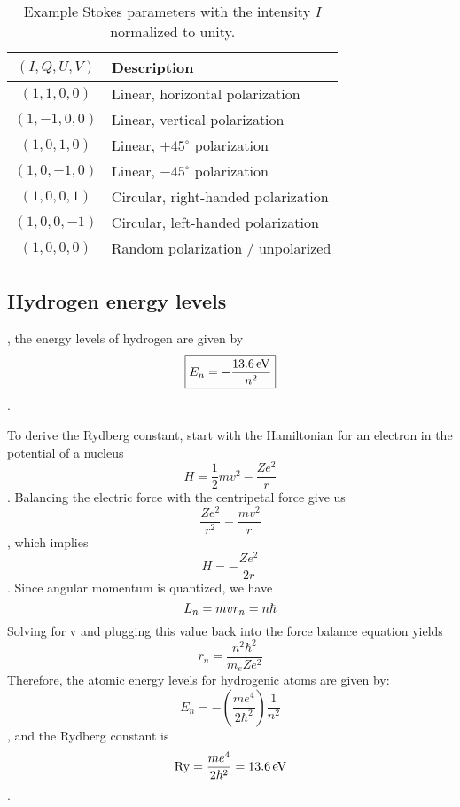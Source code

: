 \begin{table}[ht]
\centering
\begin{tabular}{cl}
\toprule
$(I,Q,U,V)$ & Description \\
\midrule
$(1,1,0,0)$ & Linear, horizontal polarization \\
$(1,-1,0,0)$ & Linear, vertical polarization \\
$(1,0,1,0)$ & Linear, $+45^\circ$ polarization \\
$(1,0,-1,0)$ & Linear, $-45^\circ$ polarization \\
$(1,0,0,1)$ & Circular, right-handed polarization \\
$(1,0,0,-1)$ & Circular, left-handed polarization \\
$(1,0,0,0)$ & Random polarization / unpolarized \\
\bottomrule
\end{tabular}
\caption{Example Stokes parameters with the intensity $I$ normalized to unity.}
\label{tab:stokes}
\end{table}

\subsection{Hydrogen energy levels}
, the energy levels of hydrogen are given by
\begin{dmath}\boxed{
E_n = -\frac{13.6\,{\rm eV}}{n^2}
}\end{dmath}.

To derive the Rydberg constant, start with the Hamiltonian for an electron in the
potential of a nucleus
\begin{dmath}
H = \frac{1}{2}mv^2 - \frac{Ze^2}{r}
\end{dmath}.
Balancing the electric force with the centripetal force give us
\begin{dmath*}
\frac{Ze^2}{r^2} = \frac{mv^2}{r}
\end{dmath*},
which implies
\begin{dmath}
H = -\frac{Ze^2}{2r}
\end{dmath}.
Since angular momentum is quantized, we have
\begin{dmath}
L_n = mvr_n \nolinebreak = n\hbar
\end{dmath}
Solving for v and plugging this value back into the force balance equation yields
\begin{dmath*}
r_n = \frac{n^2\hbar^2}{m_eZe^2}
\end{dmath*}
Therefore, the atomic energy levels for hydrogenic atoms are given by:
\begin{dmath}
E_n = -\left(\frac{me^4}{2\hbar^2}\right)\frac{1}{n^2}
\end{dmath},
and the Rydberg constant is
\begin{dmath}
{\rm Ry} = \frac{me^4}{2\hbar^2} \nolinebreak = 13.6\,{\rm eV}
\end{dmath}.

